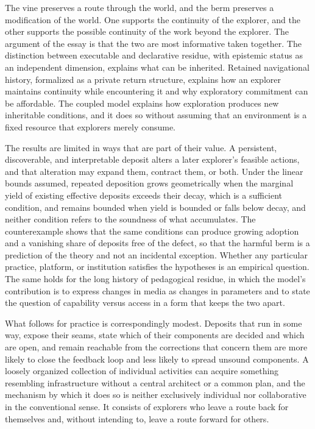 \documentclass[11pt]{article}
\theoremstyle{definition}
\theoremstyle{remark}
\begin{document}
The vine preserves a route through the world, and the berm preserves a modification of the world. One supports the continuity of the explorer, and the other supports the possible continuity of the work beyond the explorer. The argument of the essay is that the two are most informative taken together. The distinction between executable and declarative residue, with epistemic status as an independent dimension, explains what can be inherited. Retained navigational history, formalized as a private return structure, explains how an explorer maintains continuity while encountering it and why exploratory commitment can be affordable. The coupled model explains how exploration produces new inheritable conditions, and it does so without assuming that an environment is a fixed resource that explorers merely consume.

The results are limited in ways that are part of their value. A persistent, discoverable, and interpretable deposit alters a later explorer's feasible actions, and that alteration may expand them, contract them, or both. Under the linear bounds assumed, repeated deposition grows geometrically when the marginal yield of existing effective deposits exceeds their decay, which is a sufficient condition, and remains bounded when yield is bounded or falls below decay, and neither condition refers to the soundness of what accumulates. The counterexample shows that the same conditions can produce growing adoption and a vanishing share of deposits free of the defect, so that the harmful berm is a prediction of the theory and not an incidental exception. Whether any particular practice, platform, or institution satisfies the hypotheses is an empirical question. The same holds for the long history of pedagogical residue, in which the model's contribution is to express changes in media as changes in parameters and to state the question of capability versus access in a form that keeps the two apart.

What follows for practice is correspondingly modest. Deposits that run in some way, expose their seams, state which of their components are decided and which are open, and remain reachable from the corrections that concern them are more likely to close the feedback loop and less likely to spread unsound components. A loosely organized collection of individual activities can acquire something resembling infrastructure without a central architect or a common plan, and the mechanism by which it does so is neither exclusively individual nor collaborative in the conventional sense. It consists of explorers who leave a route back for themselves and, without intending to, leave a route forward for others.
\end{document}

